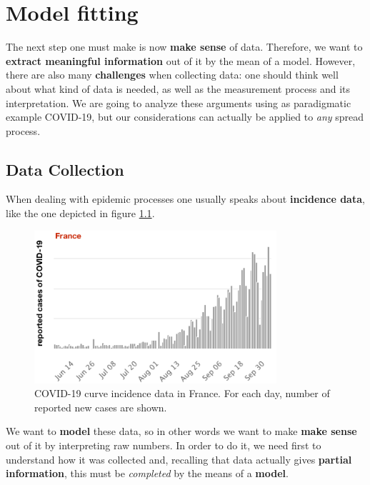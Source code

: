 \documentclass[../main/main.tex]{subfiles}
\begin{document}
\chapter{Model fitting}

The next step one must make is now \textbf{make sense} of data. Therefore, we want to \textbf{extract meaningful information} out of it by the mean of a model. However, there are also many \textbf{challenges} when collecting data: one should think well about what kind of data is needed, as well as the measurement process and its interpretation. We are going to analyze these arguments using as paradigmatic example COVID-19, but our considerations can actually be applied to \textit{any} spread process.

\section{Data Collection}

When dealing with epidemic processes one usually speaks about \textbf{incidence data}, like the one depicted in figure \ref{fig:19_01}.

\begin{figure}[h!]
\centering
\includegraphics[width=0.8\textwidth]{../lessons/image/19/image01.png}
\caption{\label{fig:19_01} COVID-19 curve incidence data in France. For each day, number of reported new cases are shown.}
\end{figure}

We want to \textbf{model} these data, so in other words we want to make \textbf{make sense} out of it by interpreting raw numbers. In order to do it, we need first to understand how it was collected and, recalling that data actually gives \textbf{partial information}, this must be \textit{completed} by the means of a \textbf{model}.
\end{document}
